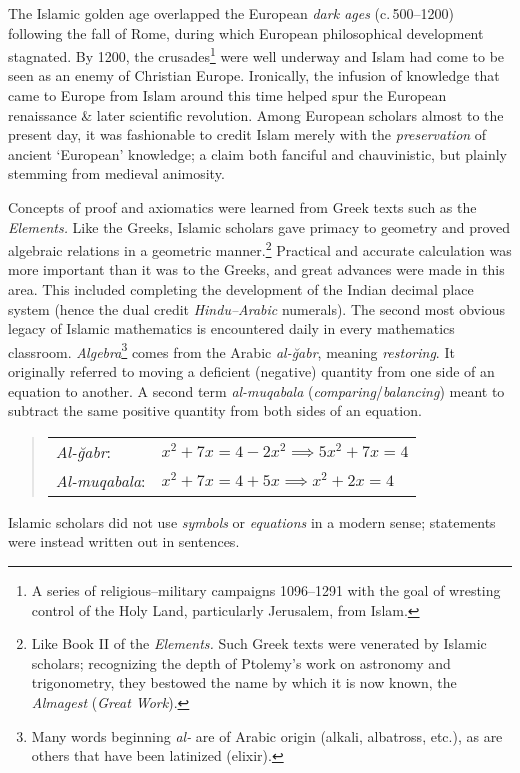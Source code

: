 The Islamic golden age overlapped the European \emph{dark ages} (c.\,500--1200) following the fall of Rome, during which European philosophical development stagnated. By 1200, the crusades\footnote{A series of religious--military campaigns 1096--1291 with the goal of wresting control of the Holy Land, particularly Jerusalem, from Islam.} were well underway and Islam had come to be seen as an enemy of Christian Europe. Ironically, the infusion of knowledge that came to Europe from Islam around this time helped spur the European renaissance \& later scientific revolution. Among European scholars almost to the present day, it was fashionable to credit Islam merely with the \emph{preservation} of ancient `European' knowledge; a claim both fanciful and chauvinistic, but plainly stemming from medieval animosity.

\goodbreak



Concepts of proof and axiomatics were learned from Greek texts such as the \emph{Elements.} Like the Greeks, Islamic scholars gave primacy to geometry and proved algebraic relations in a geometric manner.\footnote{Like Book II of the \emph{Elements.} 
Such Greek texts were venerated by Islamic scholars; recognizing the depth of Ptolemy's work on astronomy and trigonometry, they bestowed the name by which it is now known, the \emph{Almagest} (\emph{Great Work}).} Practical and accurate calculation was more important than it was to the Greeks, and great advances were made in this area. This included completing the development of the Indian decimal place system (hence the dual credit \emph{Hindu--Arabic} numerals).\smallbreak
The second most obvious legacy of Islamic mathematics is encountered daily in every mathematics classroom. \emph{Algebra}\footnote{Many words beginning \emph{al-} are of Arabic origin (alkali, albatross, etc.), as are others that have been latinized (elixir).} comes from the Arabic \emph{al-ğabr}, meaning \emph{restoring}. It originally referred to moving a deficient (negative) quantity from one side of an equation to another. A second term \emph{al-muqabala} (\emph{comparing}/\emph{balancing}) meant to subtract the same positive quantity from both sides of an equation.
\begin{quote}
	\begin{tabular}{l@{\quad}l}
		\emph{Al-ğabr}:&$x^2+7x=4-2x^2\implies 5x^2+7x=4$\\[4pt]
		\emph{Al-muqabala}:&$x^2+7x=4+5x\implies x^2+2x=4$
	\end{tabular}
\end{quote}
Islamic scholars did not use \emph{symbols} or \emph{equations} in a modern sense; statements were instead written out in sentences.


